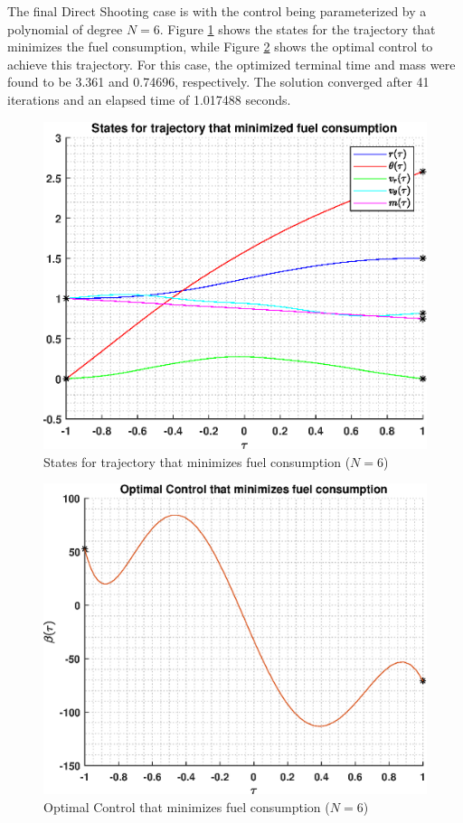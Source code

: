 \documentclass[]{article}
\begin{document}
The final Direct Shooting case is with the control being parameterized by a polynomial of degree \(N = 6\). Figure \ref{fig:directStatesPoly6} shows the states for the trajectory that minimizes the fuel consumption, while Figure \ref{fig:directControlPoly6} shows the optimal control to achieve this trajectory. For this case, the optimized terminal time and mass were found to be 3.361 and 0.74696, respectively. The solution converged after 41 iterations and an elapsed time of 1.017488 seconds.
\begin{figure}
	\centering
	\includegraphics[scale=0.75]{directStatesPoly6.eps}
	\caption{States for trajectory that minimizes fuel consumption (\(N = 6\))}
	\label{fig:directStatesPoly6}
\end{figure}
\begin{figure}
	\centering
	\includegraphics[scale=0.75]{directControlPoly6.eps}
	\caption{Optimal Control that minimizes fuel consumption (\(N = 6\))}
	\label{fig:directControlPoly6}
\end{figure}
\end{document}
